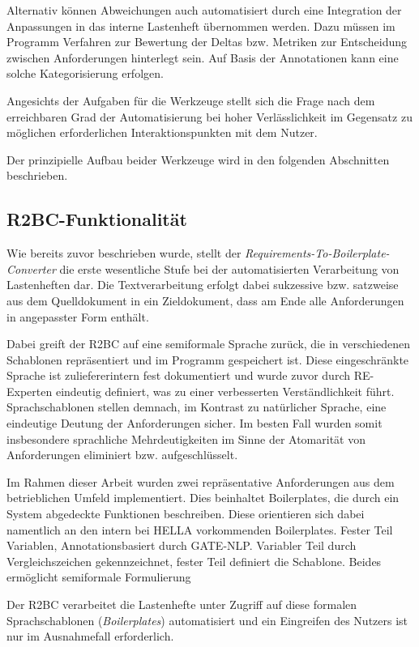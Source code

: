 \documentclass[12pt]{report}
\begin{document}
Alternativ können Abweichungen auch automatisiert durch eine Integration der Anpassungen in das interne Lastenheft übernommen werden. Dazu müssen im Programm Verfahren zur Bewertung der Deltas bzw. Metriken zur Entscheidung zwischen Anforderungen hinterlegt sein. Auf Basis der Annotationen kann eine solche Kategorisierung erfolgen.

Angesichts der Aufgaben für die Werkzeuge stellt sich die Frage nach dem erreichbaren Grad der Automatisierung bei hoher Verlässlichkeit im Gegensatz zu möglichen erforderlichen Interaktionspunkten mit dem Nutzer. 

Der prinzipielle Aufbau beider Werkzeuge wird in den folgenden Abschnitten beschrieben.

\subsection{R2BC-Funktionalität}
Wie bereits zuvor beschrieben wurde, stellt der \textit{Requirements-To-Boilerplate-Converter} die erste wesentliche Stufe bei der automatisierten Verarbeitung von Lastenheften dar. Die Textverarbeitung erfolgt dabei sukzessive bzw. satzweise aus dem Quelldokument in ein Zieldokument, dass am Ende alle Anforderungen in angepasster Form enthält. 

Dabei greift der R2BC auf eine semiformale Sprache zurück, die in verschiedenen Schablonen repräsentiert und im Programm gespeichert ist. Diese eingeschränkte Sprache ist zuliefererintern fest dokumentiert und wurde zuvor durch RE-Experten eindeutig definiert, was zu einer verbesserten Verständlichkeit führt. Sprachschablonen stellen demnach, im Kontrast zu natürlicher Sprache, eine eindeutige Deutung der Anforderungen sicher. Im besten Fall wurden somit insbesondere sprachliche Mehrdeutigkeiten im Sinne der Atomarität von Anforderungen eliminiert bzw. aufgeschlüsselt.

Im Rahmen dieser Arbeit wurden zwei repräsentative Anforderungen aus dem betrieblichen Umfeld implementiert. Dies beinhaltet Boilerplates, die durch ein System abgedeckte Funktionen beschreiben. Diese orientieren sich dabei namentlich an den intern bei HELLA vorkommenden Boilerplates. Fester Teil Variablen, Annotationsbasiert durch GATE-NLP. Variabler Teil durch Vergleichszeichen gekennzeichnet, fester Teil definiert die Schablone. Beides ermöglicht semiformale Formulierung

Der R2BC verarbeitet die Lastenhefte unter Zugriff auf diese formalen Sprachschablonen (\textit{Boilerplates}) automatisiert und ein Eingreifen des Nutzers ist nur im Ausnahmefall erforderlich. 
\end{document}
